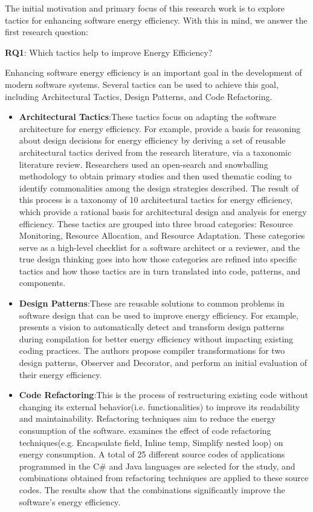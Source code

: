The initial motivation and primary focus of this research work is to explore tactics for enhancing software energy efficiency. With this in mind, we  answer the first research question:

\vspace{1em}
\textbf{RQ1}: Which tactics help to improve Energy Efficiency?

\vspace{1em}
Enhancing software energy efficiency is an important goal in the development of modern software systems. Several tactics can be used to achieve this goal, including Architectural Tactics, Design Patterns, and Code Refactoring. 

\begin{itemize}
    \item \textbf{Architectural Tactics}:These tactics focus on adapting the software architecture for energy efficiency. For example, \cite{DBLP:conf/hicss/ParadisKT21} provide a basis for reasoning about design decisions for energy efficiency by deriving a set of reusable architectural tactics derived from the research literature, via a taxonomic literature review. Researchers used an open-search and snowballing methodology to obtain primary studies and then used thematic coding to identify commonalities among the design strategies described. The result of this process is a taxonomy of 10 architectural tactics for energy efficiency, which provide a rational basis for architectural design and analysis for energy efficiency. These tactics are grouped into three broad categories: Resource Monitoring, Resource Allocation, and Resource Adaptation. These categories serve as a high-level checklist for a software architect or a reviewer, and the true design thinking goes into how those categories are refined into specific tactics and how those tactics are in turn translated into code, patterns, and components.
    \item \textbf{Design Patterns}:These are reusable solutions to common problems in software design that can be used to improve energy efficiency. For example, \cite{DBLP:conf/icse/NoureddineR15} presents a vision to automatically detect and transform design patterns during compilation for better energy efficiency without impacting existing coding practices. The authors propose compiler transformations for two design patterns, Observer and Decorator, and perform an initial evaluation of their energy efficiency. 
    \item \textbf{Code Refactoring}:This is the process of restructuring existing code without changing its external behavior(i.e. functionalities) to improve its readability and maintainability. Refactoring techniques aim to reduce the energy consumption of the software. \cite{csanlialp2022energy} examines the effect of code refactoring techniques(e.g. Encapsulate field, Inline temp, Simplify nested loop) on energy consumption. A total of 25 different source codes of applications programmed in the C\# and Java languages are selected for the study, and combinations obtained from refactoring techniques are applied to these source codes. The results show that the combinations significantly improve the software’s energy efficiency.
\end{itemize}

